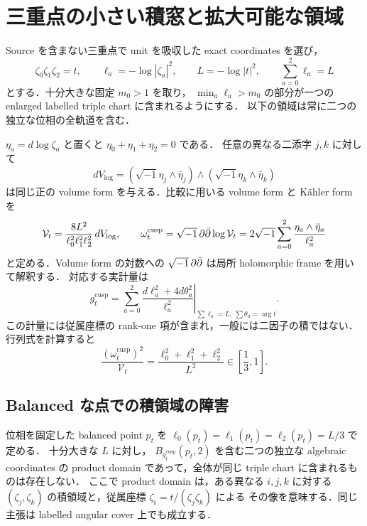 \section{三重点の小さい積窓と拡大可能な領域}
\label{coarse:sec:triple-windows}

Source を含まない三重点で unit を吸収した exact coordinates を選び，
\begin{equation}\label{coarse:eq:exact-triple-window-model}
 \zeta_0\zeta_1\zeta_2=t,
 \qquad \ell_a=-\log|\zeta_a|^2,
 \qquad L=-\log|t|^2,
 \qquad \sum_{a=0}^2\ell_a=L
\end{equation}
とする．十分大きな固定 $m_0>1$ を取り，
$\min_a\ell_a>m_0$ の部分が一つの enlarged labelled triple chart に含まれるようにする．
以下の領域は常に二つの独立な位相の全軌道を含む．

$\eta_a=d\log\zeta_a$ と置くと $\eta_0+\eta_1+\eta_2=0$ である．
任意の異なる二添字 $j,k$ に対して
\[
 dV_{\log}
  =(\sqrt{-1}\eta_j\wedge\bar\eta_j)
    \wedge(\sqrt{-1}\eta_k\wedge\bar\eta_k)
\]
は同じ正の volume form を与える．比較に用いる volume form と K\"ahler form を
\begin{equation}\label{coarse:eq:triple-cusp-reference}
 \mathcal V_t
  =\frac{8L^2}{\ell_0^2\ell_1^2\ell_2^2}\,dV_{\log},
 \qquad
 \omega_t^{\mathrm{cusp}}
  =\sqrt{-1}\,\partial\bar\partial\log\mathcal V_t
  =2\sqrt{-1}\sum_{a=0}^2
       \frac{\eta_a\wedge\bar\eta_a}{\ell_a^2}
\end{equation}
と定める．Volume form の対数への $\sqrt{-1}\,\partial\bar\partial$ は局所 holomorphic frame を用いて解釈する．
対応する実計量は
\begin{equation}\label{coarse:eq:constrained-triple-cusp-metric}
 g_t^{\mathrm{cusp}}
 =\left.
    \sum_{a=0}^2\frac{d\ell_a^2+4d\theta_a^2}{\ell_a^2}
   \right|_{\sum\ell_a=L,\ \sum\theta_a=\arg t}.
\end{equation}
この計量には従属座標の rank-one 項が含まれ，一般には二因子の積ではない．
行列式を計算すると
\begin{equation}\label{coarse:eq:triple-cusp-exact-volume-ratio}
 \frac{(\omega_t^{\mathrm{cusp}})^2}{\mathcal V_t}
  =\frac{\ell_0^2+\ell_1^2+\ell_2^2}{L^2}
  \in\left[\frac13,1\right].
\end{equation}

\subsection{Balanced な点での積領域の障害}

\begin{proposition}[一つの積領域には入らない固定半径球]
\label{coarse:prop:triple-product-obstruction}
位相を固定した balanced point
$p_t$ を $\ell_0(p_t)=\ell_1(p_t)=\ell_2(p_t)=L/3$ で定める．
十分大きな $L$ に対し，
$B_{g_t^{\mathrm{cusp}}}(p_t,2)$ を含む二つの独立な algebraic coordinates の
product domain であって，全体が同じ triple chart に含まれるものは存在しない．
ここで product domain は，ある異なる $i,j,k$ に対する
$(\zeta_j,\zeta_k)$ の積領域と，従属座標 $\zeta_i=t/(\zeta_j\zeta_k)$ による
その像を意味する．同じ主張は labelled angular cover 上でも成立する．
\end{proposition}


